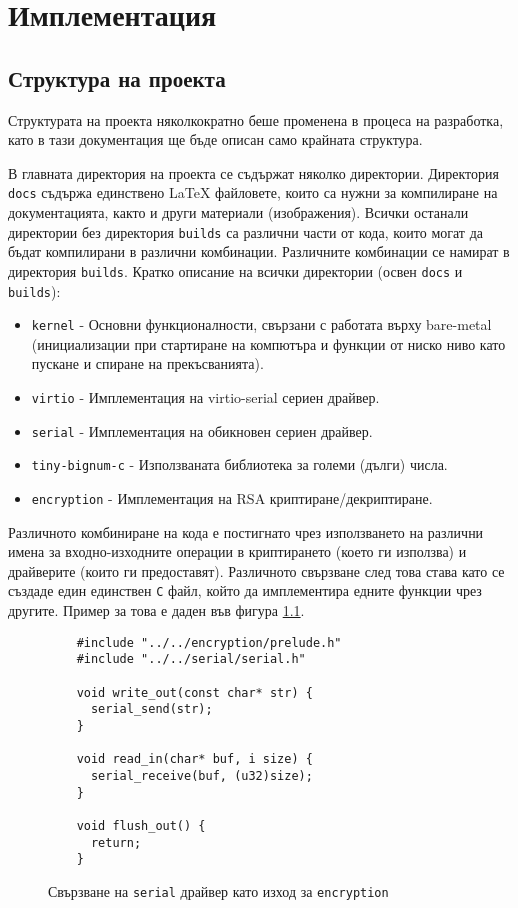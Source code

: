 \chapter{Имплементация} %
\section{Структура на проекта}
Структурата на проекта няколкократно беше променена в процеса на разработка, като в тази документация ще бъде описан само крайната структура.

В главната директория на проекта се съдържат няколко директории. Директория {\tt docs} съдържа единствено \LaTeX{} файловете, които са нужни за компилиране на документацията, както и други материали (изображения). Всички останали директории без директория {\tt builds} са различни части от кода, които могат да бъдат компилирани в различни комбинации. Различните комбинации се намират в директория {\tt builds}. Кратко описание на всички директории (освен {\tt docs} и {\tt builds}):
\begin{itemize}
  \item {\tt kernel} - Основни функционалности, свързани с работата върху bare-metal (инициализации при стартиране на компютъра и функции от ниско ниво като пускане и спиране на прекъсванията).
  \item {\tt virtio} - Имплементация на virtio-serial сериен драйвер.
  \item {\tt serial} - Имплементация на обикновен сериен драйвер.
  \item {\tt tiny-bignum-c} - Използваната библиотека за големи (дълги) числа.
  \item {\tt encryption} - Имплементация на RSA криптиране/декриптиране.
\end{itemize}

Различното комбиниране на кода е постигнато чрез използването на различни имена за входно-изходните операции в криптирането (което ги използва) и драйверите (които ги предоставят). Различното свързване след това става като се създаде един единствен {\tt C} файл, който да имплементира едните функции чрез другите. Пример за това е даден във фигура \ref{fig:io-file-example}.
\begin{figure}[htpb]
  \centering
  \caption{Свързване на {\tt serial} драйвер като изход за {\tt encryption}}
  \begin{verbatim}
    #include "../../encryption/prelude.h"
    #include "../../serial/serial.h"

    void write_out(const char* str) {
      serial_send(str);
    }

    void read_in(char* buf, i size) {
      serial_receive(buf, (u32)size);
    }

    void flush_out() {
      return;
    }
  \end{verbatim}
  \label{fig:io-file-example}
\end{figure}

